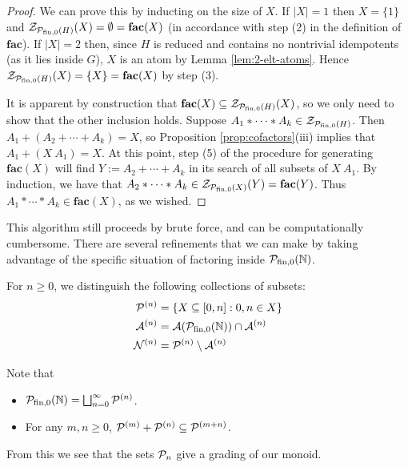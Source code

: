 \begin{proof}
We can prove this by inducting on the size of $X$.
If $|X|=1$ then $X = \{1\}$ and $\Z_{\P_\fon(H)}(X) = \emptyset = \mathbf{fac}(X)$ (in accordance with step (2) in the definition of $\mathbf{fac}$).
If $|X| = 2$ then, since $H$ is reduced and contains no nontrivial idempotents (as it lies inside $G$), $X$ is an atom by Lemma \ref{lem:2-elt-atoms}.
Hence $\Z_{\P_\fon(H)}(X) = \{X\} = \mathbf{fac}(X)$ by step (3).
	
It is apparent by construction that $\mathbf{fac}(X) \subseteq \Z_{\P_\fon(H)}(X)$, so we only need to show that the other inclusion holds.
Suppose $A_1*\cdots*A_k \in \Z_{\P_\fon(H)}$.
Then $A_1 + (A_2 + \cdots + A_k) = X$, so Proposition \ref{prop:cofactors}(iii) implies that $A_1 + (X\:A_1) = X$.
At this point, step (5) of the procedure for generating $\mathbf{fac}(X)$ will find $Y:=A_2+\cdots+A_k$ in its search of all subsets of $X\:A_1$.
By induction, we have that $A_2*\cdots*A_k \in \Z_{\P_\fon(X)}(Y) = \mathbf{fac}(Y)$.
Thus $A_1 * \cdots * A_k \in \mathbf{fac}(X)$, as we wished.
\end{proof}

This algorithm still proceeds by brute force, and can be computationally cumbersome.  
There are several refinements that we can make by taking advantage of the specific situation of factoring inside $\PN$.

\begin{defn} \label{def:filtration}
	For $n\ge 0$, we distinguish the following collections of subsets:
	\begin{align*}
	\P^{(n)} &= \{ X \subseteq [ 0,n ] : 0,n\in X \} \\
	\mathcal{A}^{(n)} &= \mathcal{A}(\PN) \cap \A^{(n)}  \\
	\mathcal{N}^{(n)} &= \P^{(n)} \setminus \mathcal{A}^{(n)} 
	\end{align*}
\end{defn}

\begin{rk}
Note that 
\begin{itemize}
	\item $\PN = \bigsqcup_{n=0}^\infty \P^{(n)}$.
	\item For any $m,n\ge 0$, $\P^{(m)} + \P^{(n)} \subseteq \P^{(m+n)}$.
\end{itemize}
From this we see that the sets $\P_n$ give a grading of our monoid.
\end{rk}

